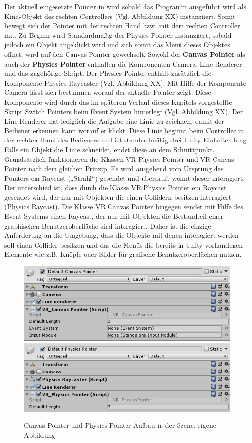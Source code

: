 \newline
Der aktuell eingesetzte Pointer in wird sobald das Programm ausgeführt wird als Kind-Objekt des rechten Controllers (Vgl. Abbildung XX) instanziiert. Somit bewegt sich der Pointer mit der rechten Hand bzw. mit dem rechten Controller mit. Zu Beginn wird Standardmäßig der Physics Pointer instanziiert, sobald jedoch ein Objekt angeklickt wird und sich somit das Menü dieses Objektes öffnet, wird auf den Canvas Pointer gewechselt.
\newline
Sowohl der \textbf{Canvas Pointer} als auch der \textbf{Physics Pointer} enthalten die Komponenten Camera, Line Renderer und das zugehörige Skript. Der Physics Pointer enthält zusätzlich die Komponente Physics Raycaster (Vgl. Abbildung XX). Mit Hilfe der Komponente Camera lässt sich bestimmen worauf der aktuelle Pointer zeigt. Diese Komponente wird durch das im späteren Verlauf dieses Kapitels vorgestellte Skript Switch Pointers beim Event System hinterlegt (Vgl. Abbildung XX). Der Line Renderer hat lediglich die Aufgabe eine Linie zu zeichnen, damit der Bediener erkennen kann worauf er klickt. Diese Linie beginnt beim Controller in der rechten Hand des Bedieners und ist standardmäßig drei Unity-Einheiten lang. Falls ein Objekt die Linie schneidet, endet diese an dem Schnittpunkt. 
\newline
Grundsätzlich funktionieren die Klassen VR Physics Pointer und VR Canvas Pointer nach dem gleichen Prinzip. Es wird ausgehend vom Ursprung des Pointers ein Raycast („Strahl“) gesendet und überprüft womit dieser interagiert. Der unterschied ist, dass durch die Klasse VR Physics Pointer ein Raycast gesendet wird, der nur mit Objekten die einen Collidern besitzen interagiert (Physics Raycast). Die Klasse VR Canvas Pointer hingegen sendet mit Hilfe des Event Systems einen Raycast, der nur mit Objekten die Bestandteil einer graphischen Benutzeroberfläche sind interagiert. Daher ist die einzige Anforderung an die Umgebung, dass die Objekte mit denen interagiert werden soll einen Collider besitzen und das die Menüs die bereits in Unity vorhandenen Elemente wie z.B. Knöpfe oder Slider für grafische Benutzeroberflächen nutzen.
\begin{figure}[h]
	\centering
	\includegraphics[width=0.5\linewidth]{Bilder/A42_CanvasPointer}
	\includegraphics[width=0.5\linewidth]{Bilder/A43_PhysicsPointer}
	\caption{Canvas Pointer und Physics Pointer Aufbau in der Szene, eigene Abbildung}
	\label{fig:Pointer}
\end{figure}
